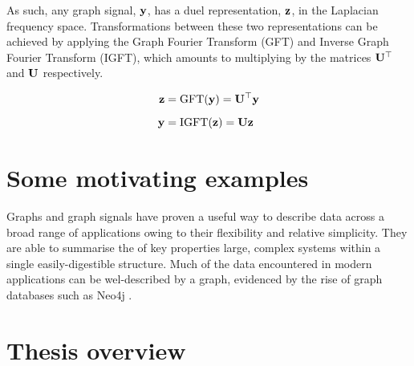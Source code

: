 As such, any graph signal, $\mathbf{y}$, has a duel representation, $\mathbf{z}$, in the Laplacian frequency space. Transformations between these two representations can be achieved by applying the Graph Fourier Transform (GFT) and Inverse Graph Fourier Transform (IGFT), which amounts to multiplying by the matrices $\mathbf{U}^\top$ and $\mathbf{U}$ respectively. 

\begin{align}
    \mathbf{z} &= \text{GFT}(\mathbf{y}) = \mathbf{U}^\top \mathbf{y} \\[0.2cm]
    \mathbf{y} &= \text{IGFT}(\mathbf{z})  = \mathbf{U} \mathbf{z}
\end{align}






\section{Some motivating examples}

Graphs and graph signals have proven a useful way to describe data across a broad range of applications owing to their flexibility and relative simplicity. They are able to summarise the of key properties large, complex systems within a single easily-digestible structure. Much of the data encountered in modern applications can be wel-described by a graph, evidenced by the rise of graph databases such as Neo4j \citep{Webber2012}. 


\section{Thesis overview}

\label{sec:thesis_overview}